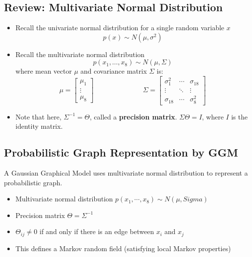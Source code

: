 \documentclass[10pt]{article}
\begin{document}
\subsection*{Review: Multivariate Normal Distribution}
\begin{itemize}
	\item Recall the univariate normal distribution for a single random variable $x$
	\[p(x) \sim N(\mu, \sigma^2)\]
    \item Recall the multivariate normal distribution
    \[p(x_1, \dots, x_8) \sim N(\mu, \Sigma)\]
    where mean vector $\mu$ and covariance matrix $\Sigma$ is:
    \[\mu = \begin{bmatrix} \mu_1 \\ \vdots \\ \mu_8 \end{bmatrix} \hspace{3cm} \Sigma = \begin{bmatrix} \sigma_{1}^2 & \cdots & \sigma_{18} \\ \vdots & \ddots & \vdots \\ \sigma_{18} & \cdots & \sigma_{8}^2 \end{bmatrix}\]
    \item Note that here, $\Sigma^{-1} = \Theta$, called a \textbf{precision matrix}.  $\Sigma \Theta = I$, where $I$ is the identity matrix.
\end{itemize}

\subsection*{Probabilistic Graph Representation by GGM}
A Gaussian Graphical Model uses multivariate normal distribution to represent a probabilistic graph.
\begin{itemize}
	\item Multivariate normal distribution $p(x_1, \cdots, x_8) \sim N(\mu, Sigma)$
	\item Precision matrix $\Theta = \Sigma^{-1}$
	\item $\Theta_{ij} \neq 0$ if and only if there is an edge between $x_i$ and $x_j$
	\item This defines a Markov random field (satisfying local Markov properties)
\end{itemize}
\end{document}
